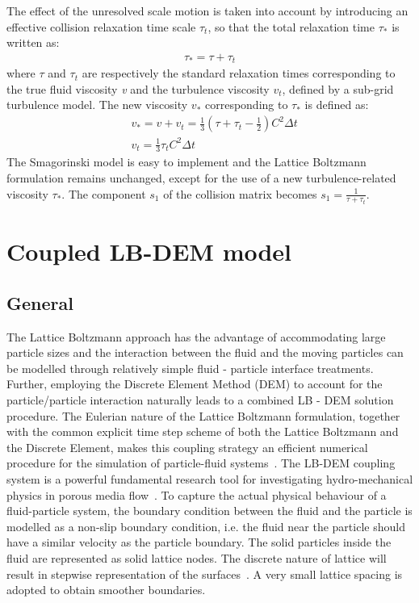 \documentclass[12pt,twoside]{tuhhproc-en}
\begin{document}
The effect of the unresolved scale motion is taken into account by introducing an effective collision relaxation time scale $\tau_{t}$, so that the total relaxation time $\tau_{*}$ is written as:
\begin{align}
\tau_{*}=\tau + \tau_{t}
\end{align}
where $\tau$ and $\tau_{t}$ are respectively the standard relaxation times corresponding to the true fluid viscosity \textit{v} and the turbulence viscosity $\mathit{v}_{\mathit{t}}$, defined by a sub-grid turbulence model. The new viscosity $\mathit{v}_{*}$ corresponding to $\tau_{*}$ is defined as:
\begin{align}
& \mathit{v}_{*}=\mathit{v}+\mathit{v}_{\mathit{t}}=\frac{1}{3}(\tau+\tau_{t}-\frac{1}{2})\mathit{C}^{2} \Delta \mathit{t}  \\
& \mathit{v}_{\mathit{t}}=\frac{1}{3}\tau_{\mathit{t}}\mathit{C}^{2} \Delta \textit{t}
\end{align}
The Smagorinski model is easy to implement and the Lattice Boltzmann formulation remains unchanged, except for the use of a new turbulence-related viscosity $\tau_{*}$. The component $s_1$ of the collision matrix becomes $s_1 = \frac{1}{\tau+\tau_t}$.


\section{Coupled LB-DEM model}
\subsection{General}
The Lattice Boltzmann approach has the advantage of accommodating large particle sizes and the interaction between the fluid and the moving particles can be modelled through relatively simple fluid - particle interface treatments. Further, employing the Discrete Element Method (DEM) to account for the particle/particle interaction naturally leads to a combined LB - DEM solution procedure. The Eulerian nature of the Lattice Boltzmann formulation, together with the common explicit time step scheme of both the Lattice Boltzmann and the Discrete Element, makes this coupling strategy an efficient numerical procedure for the simulation of particle-fluid systems~\citep{Cook2004}. The LB-DEM coupling system is a powerful fundamental research tool for investigating hydro-mechanical physics in porous media flow~\citep{Han2013}. To capture the actual physical behaviour of a fluid-particle system, the boundary condition between the fluid and the particle is modelled as a non-slip boundary condition, i.e. the fluid near the particle should have a similar velocity as the particle boundary. The solid particles inside the fluid are represented as solid lattice nodes. The discrete nature of lattice will result in stepwise representation of the surfaces~\citep{Kumar2015}. A very small lattice spacing is adopted to obtain smoother boundaries.
\end{document}

